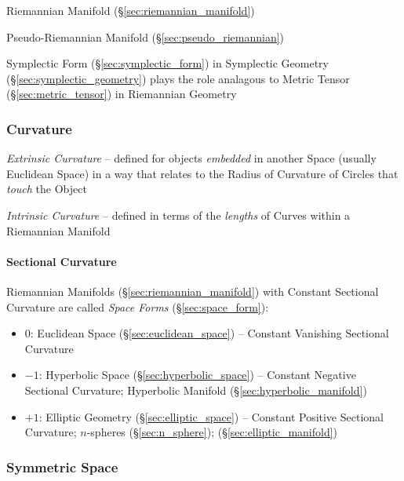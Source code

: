\begin{itemize}
Riemannian Manifold (\S\ref{sec:riemannian_manifold})

Pseudo-Riemannian Manifold (\S\ref{sec:pseudo_riemannian})

Symplectic Form (\S\ref{sec:symplectic_form}) in Symplectic Geometry
(\S\ref{sec:symplectic_geometry}) plays the role analagous to Metric Tensor
(\S\ref{sec:metric_tensor}) in Riemannian Geometry



\subsubsection{Curvature}\label{sec:reimannian_curvature}


\emph{Extrinsic Curvature} -- defined for objects \emph{embedded} in another
Space (usually Euclidean Space) in a way that relates to the Radius of
Curvature of Circles that \emph{touch} the Object

\emph{Intrinsic Curvature} -- defined in terms of the \emph{lengths} of Curves
within a Riemannian Manifold



\paragraph{Sectional Curvature}\label{sec:sectional_curvature}\hfill


Riemannian Manifolds (\S\ref{sec:riemannian_manifold}) with Constant Sectional
Curvature are called \emph{Space Forms} (\S\ref{sec:space_form}):
\begin{itemize}
  \item $0$: Euclidean Space (\S\ref{sec:euclidean_space}) -- Constant
    Vanishing Sectional Curvature
  \item $-1$: Hyperbolic Space (\S\ref{sec:hyperbolic_space}) -- Constant
    Negative Sectional Curvature; Hyperbolic Manifold
    (\S\ref{sec:hyperbolic_manifold})
  \item $+1$: Elliptic Geometry (\S\ref{sec:elliptic_space}) -- Constant
    Positive Sectional Curvature; $n$-spheres (\S\ref{sec:n_sphere});
    (\S\ref{sec:elliptic_manifold})
\end{itemize}



\subsubsection{Symmetric Space}\label{sec:symmetric_space}


\end{itemize}
